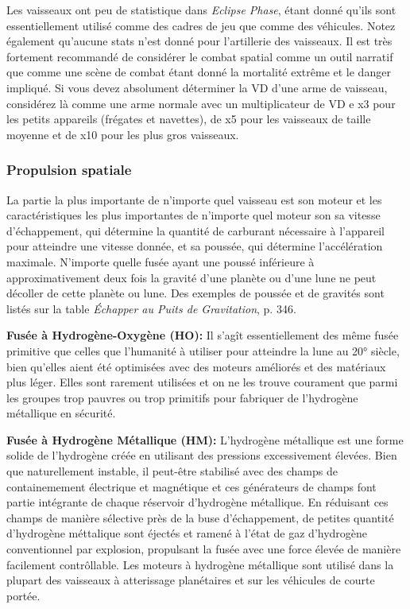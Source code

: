 Les vaisseaux ont peu de statistique dans \emph{Eclipse Phase}, étant donné qu'ils sont essentiellement utilisé comme des cadres de jeu que comme des véhicules. Notez également qu'aucune stats n'est donné pour l'artillerie des vaisseaux. Il est très fortement recommandé de considérer le combat spatial comme un outil narratif que comme une scène de combat étant donné la mortalité extrême et le danger impliqué. Si vous devez absolument déterminer la VD d'une arme de vaisseau, considérez là comme une arme normale avec un multiplicateur de VD e x3 pour les petits appareils (frégates et navettes), de x5 pour les vaisseaux de taille moyenne et de x10 pour les plus gros vaisseaux. 

\subsubsection{Propulsion spatiale} 

La partie la plus importante de n'importe quel vaisseau est son moteur et les caractéristiques les plus importantes de n'importe quel moteur son sa vitesse d'échappement, qui détermine la quantité de carburant nécessaire à l'appareil pour atteindre une vitesse donnée, et sa poussée, qui détermine l'accélération maximale. N'importe quelle fusée ayant une poussé inférieure à approximativement deux fois la gravité d'une planète ou d'une lune ne peut décoller de cette planète ou lune. Des exemples de poussée et de gravités sont listés sur la table \emph{Échapper au Puits de Gravitation}, p. 346. 

\textbf{Fusée à Hydrogène-Oxygène (HO):} Il s'agît essentiellement des même fusée primitive que celles que l'humanité à utiliser pour atteindre la lune au 20° siècle, bien qu'elles aient été optimisées avec des moteurs améliorés et des matériaux plus léger. Elles sont rarement utilisées et on ne les trouve courament que parmi les groupes trop pauvres ou trop primitifs pour fabriquer de l'hydrogène métallique en sécurité. 

\textbf{Fusée à Hydrogène Métallique (HM):} L'hydrogène métallique est une forme solide de l'hydrogène créée en utilisant des pressions excessivement élevées. Bien que naturellement instable, il peut-être stabilisé avec des champs de containemement électrique et magnétique et ces générateurs de champs font partie intégrante de chaque réservoir d'hydrogène métallique. En réduisant ces champs de manière sélective près de la buse d'échappement, de petites quantité d'hydrogène méttalique sont éjectés et ramené à l'état de gaz d'hydrogène conventionnel par explosion, propulsant la fusée avec une force élevée de manière facilement contrôllable. Les moteurs à hydrogène métallique sont utilisé dans la plupart des vaisseaux à atterissage planétaires et sur les véhicules de courte portée. 

